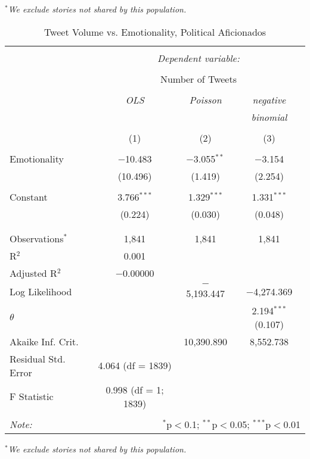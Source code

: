 \emph{$^{*}$We exclude stories not shared by this population.} 
\newpage 
\begin{table}[!htbp] \centering 
  \caption{Tweet Volume vs. Emotionality, Political Aficionados} 
  \label{} 
\begin{tabular}{@{\extracolsep{5pt}}lccc} 
\\[-1.8ex]\hline 
\hline \\[-1.8ex] 
 & \multicolumn{3}{c}{\textit{Dependent variable:}} \\ 
\cline{2-4} 
\\[-1.8ex] & \multicolumn{3}{c}{Number of Tweets} \\ 
\\[-1.8ex] & \textit{OLS} & \textit{Poisson} & \textit{negative} \\ 
 & \textit{} & \textit{} & \textit{binomial} \\ 
\\[-1.8ex] & (1) & (2) & (3)\\ 
\hline \\[-1.8ex] 
 Emotionality & $-$10.483 & $-$3.055$^{**}$ & $-$3.154 \\ 
  & (10.496) & (1.419) & (2.254) \\ 
  & & & \\ 
 Constant & 3.766$^{***}$ & 1.329$^{***}$ & 1.331$^{***}$ \\ 
  & (0.224) & (0.030) & (0.048) \\ 
  & & & \\ 
\hline \\[-1.8ex] 
Observations$^{*}$ & 1,841 & 1,841 & 1,841 \\ 
R$^{2}$ & 0.001 &  &  \\ 
Adjusted R$^{2}$ & $-$0.00000 &  &  \\ 
Log Likelihood &  & $-$5,193.447 & $-$4,274.369 \\ 
$\theta$ &  &  & 2.194$^{***}$  (0.107) \\ 
Akaike Inf. Crit. &  & 10,390.890 & 8,552.738 \\ 
Residual Std. Error & 4.064 (df = 1839) &  &  \\ 
F Statistic & 0.998 (df = 1; 1839) &  &  \\ 
\hline 
\hline \\[-1.8ex] 
\textit{Note:}  & \multicolumn{3}{r}{$^{*}$p$<$0.1; $^{**}$p$<$0.05; $^{***}$p$<$0.01} \\ 
\end{tabular} 
\end{table}
\emph{$^{*}$We exclude stories not shared by this population.} 
\newpage 

